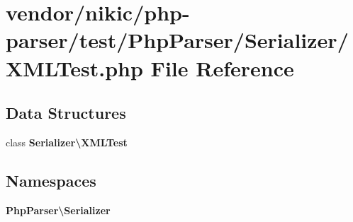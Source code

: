 \section{vendor/nikic/php-\/parser/test/\+Php\+Parser/\+Serializer/\+X\+M\+L\+Test.php File Reference}
\label{nikic_2php-parser_2test_2_php_parser_2_serializer_2_x_m_l_test_8php}
\subsection*{Data Structures}
\begin{DoxyCompactItemize}
\item 
class {\bf Serializer\textbackslash{}\+X\+M\+L\+Test}
\end{DoxyCompactItemize}
\subsection*{Namespaces}
\begin{DoxyCompactItemize}
\item 
 {\bf Php\+Parser\textbackslash{}\+Serializer}
\end{DoxyCompactItemize}
